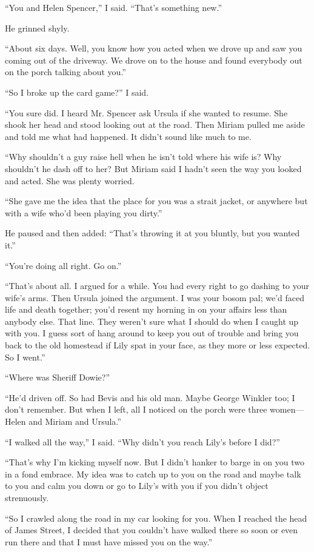 \documentclass{novel}
\begin{document}
“You and Helen Spencer,” I said. “That’s something new.”

He grinned shyly.

“About six days. Well, you know how you acted when we drove up and saw you coming out of the driveway. We drove on to the house and found everybody out on the porch talking about you.”

“So I broke up the card game?” I said.

“You sure did. I heard Mr. Spencer ask Ursula if she wanted to resume. She shook her head and stood looking out at the road. Then Miriam pulled me aside and told me what had happened. It didn’t sound like much to me. 

“Why shouldn’t a guy raise hell when he isn’t told where his wife is? Why shouldn’t he dash off to her? But Miriam said I hadn’t seen the way you looked and acted. She was plenty worried. 

“She gave me the idea that the place for you was a strait jacket, or anywhere but with a wife who’d been playing you dirty.”

He paused and then added: “That’s throwing it at you bluntly, but you wanted it.”

“You’re doing all right. Go on.”

“That’s about all. I argued for a while. You had every right to go dashing to your wife’s arms. Then Ursula joined the argument. I was your bosom pal; we’d faced life and death together; you’d resent my horning in on your affairs less than anybody else. That line. They weren’t sure what I should do when I caught up with you. I guess sort of hang around to keep you out of trouble and bring you back to the old homestead if Lily spat in your face, as they more or less expected. So I went.”

“Where was Sheriff Dowie?”

“He’d driven off. So had Bevis and his old man. Maybe George Winkler too; I don’t remember. But when I left, all I noticed on the porch were three women—Helen and Miriam and Ursula.”

“I walked all the way,” I said. “Why didn’t you reach Lily’s before I did?”

“That’s why I’m kicking myself now. But I didn’t hanker to barge in on you two in a fond embrace. My idea was to catch up to you on the road and maybe talk to you and calm you down or go to Lily’s with you if you didn’t object strenuously. 

“So I crawled along the road in my car looking for you. When I reached the head of James Street, I decided that you couldn’t have walked there so soon or even run there and that I must have missed you on the way.”
\end{document}
